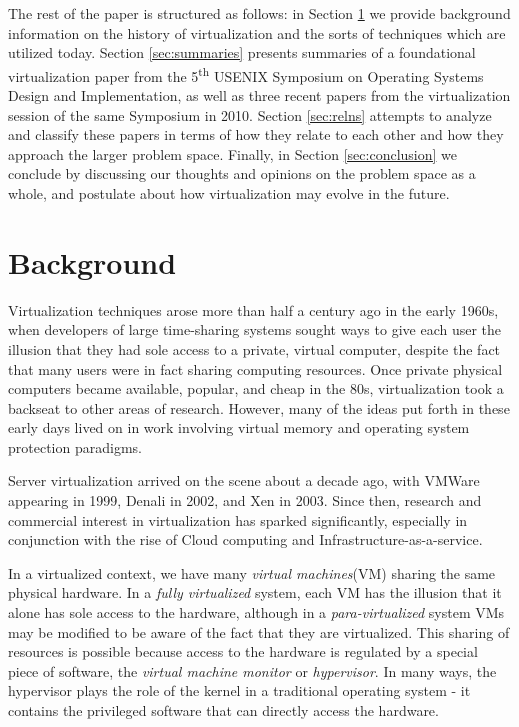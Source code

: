 \documentclass[letterpaper, twocolumn]{article}
\begin{document}
The rest of the paper is structured as follows: in Section \ref{sec:background}
we provide background information on the history of virtualization and the
sorts of techniques which are utilized today.  Section \ref{sec:summaries}
presents summaries of a foundational virtualization paper from the
5\textsuperscript{th} USENIX Symposium on Operating Systems Design
and Implementation, as well as three recent papers from the virtualization
session of the same Symposium in 2010.  Section \ref{sec:relns} attempts
to analyze and classify these papers in terms of how they
relate to each other and how they approach the larger problem space.
Finally, in Section \ref{sec:conclusion} we conclude by discussing our
thoughts and opinions on the problem space as a whole, and postulate
about how virtualization may evolve in the future.

\section{Background}
\label{sec:background}

Virtualization techniques arose more than half a century ago in the early 1960s, when developers
of large time-sharing systems sought ways to give each user the illusion that
they had sole access to a private, virtual computer, despite the fact that
many users were in fact sharing computing resources.  Once private physical
computers became available, popular, and cheap in the 80s, virtualization
took a backseat to other areas of research.  However, many of the ideas
put forth in these early days lived on in work involving virtual memory
and operating system protection paradigms.

Server virtualization arrived on the scene about a decade ago, with VMWare
appearing in 1999, Denali in 2002, and Xen in 2003.  Since then, research and commercial interest
in virtualization has sparked significantly, especially in conjunction
with the rise of Cloud computing and Infrastructure-as-a-service.

In a virtualized context, we have many \emph{virtual machines}(VM) sharing the same
physical hardware.  In a \emph{fully virtualized} system, each VM has the illusion
that it alone has sole access to the hardware, although in a \emph{para-virtualized}
system VMs may be modified to be aware of the fact that they are virtualized.  This
sharing of resources is possible because access to the hardware is regulated by
a special piece of software, the \emph{virtual machine monitor} or \emph{hypervisor}.
In many ways, the hypervisor plays the role of the kernel in a traditional operating
system - it contains the privileged software that can directly access the hardware.
\end{document}
